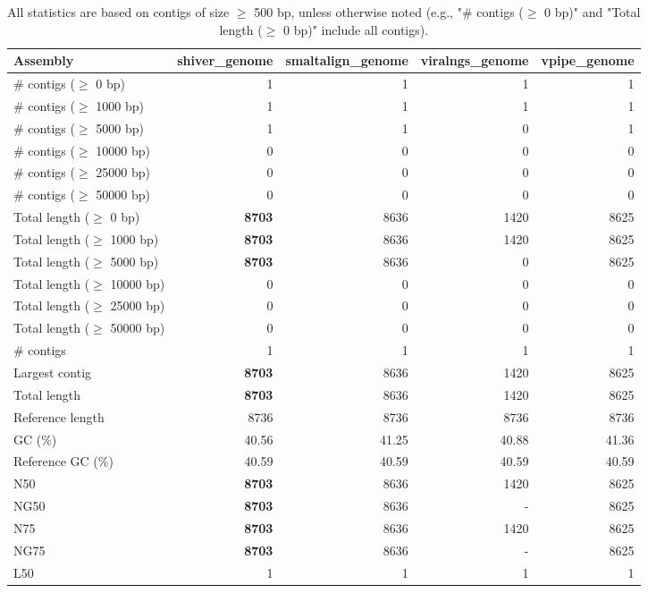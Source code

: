 \documentclass[12pt,a4paper]{article}
\begin{document}
\begin{table}[ht]
\begin{center}
\caption{All statistics are based on contigs of size $\geq$ 500 bp, unless otherwise noted (e.g., "\# contigs ($\geq$ 0 bp)" and "Total length ($\geq$ 0 bp)" include all contigs).}
\begin{tabular}{|l*{4}{|r}|}
\hline
Assembly & shiver\_genome & smaltalign\_genome & viralngs\_genome & vpipe\_genome \\ \hline
\# contigs ($\geq$ 0 bp) & 1 & 1 & 1 & 1 \\ \hline
\# contigs ($\geq$ 1000 bp) & 1 & 1 & 1 & 1 \\ \hline
\# contigs ($\geq$ 5000 bp) & 1 & 1 & 0 & 1 \\ \hline
\# contigs ($\geq$ 10000 bp) & 0 & 0 & 0 & 0 \\ \hline
\# contigs ($\geq$ 25000 bp) & 0 & 0 & 0 & 0 \\ \hline
\# contigs ($\geq$ 50000 bp) & 0 & 0 & 0 & 0 \\ \hline
Total length ($\geq$ 0 bp) & {\bf 8703} & 8636 & 1420 & 8625 \\ \hline
Total length ($\geq$ 1000 bp) & {\bf 8703} & 8636 & 1420 & 8625 \\ \hline
Total length ($\geq$ 5000 bp) & {\bf 8703} & 8636 & 0 & 8625 \\ \hline
Total length ($\geq$ 10000 bp) & 0 & 0 & 0 & 0 \\ \hline
Total length ($\geq$ 25000 bp) & 0 & 0 & 0 & 0 \\ \hline
Total length ($\geq$ 50000 bp) & 0 & 0 & 0 & 0 \\ \hline
\# contigs & 1 & 1 & 1 & 1 \\ \hline
Largest contig & {\bf 8703} & 8636 & 1420 & 8625 \\ \hline
Total length & {\bf 8703} & 8636 & 1420 & 8625 \\ \hline
Reference length & 8736 & 8736 & 8736 & 8736 \\ \hline
GC (\%) & 40.56 & 41.25 & 40.88 & 41.36 \\ \hline
Reference GC (\%) & 40.59 & 40.59 & 40.59 & 40.59 \\ \hline
N50 & {\bf 8703} & 8636 & 1420 & 8625 \\ \hline
NG50 & {\bf 8703} & 8636 & - & 8625 \\ \hline
N75 & {\bf 8703} & 8636 & 1420 & 8625 \\ \hline
NG75 & {\bf 8703} & 8636 & - & 8625 \\ \hline
L50 & 1 & 1 & 1 & 1 \\ \hline

\end{tabular}
\end{center}
\end{table}
\end{document}

